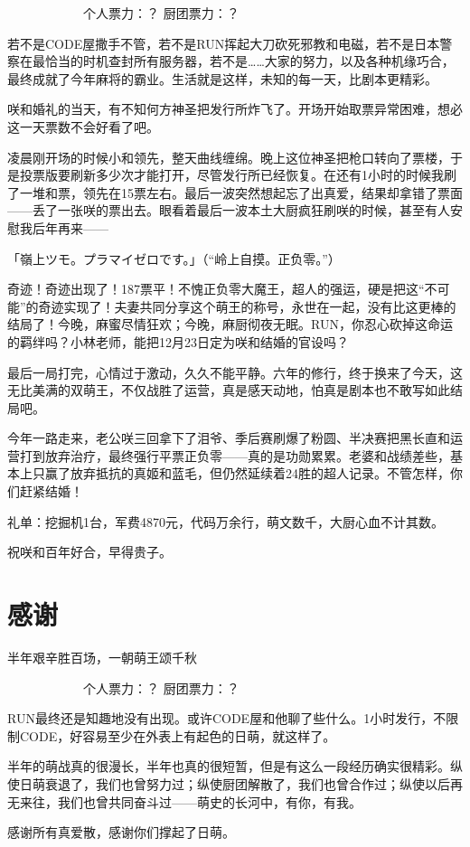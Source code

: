 　　　　　　个人票力：？ 厨团票力：？

若不是CODE屋撒手不管，若不是RUN挥起大刀砍死邪教和电磁，若不是日本警察在最恰当的时机查封所有服务器，若不是……大家的努力，以及各种机缘巧合，最终成就了今年麻将的霸业。生活就是这样，未知的每一天，比剧本更精彩。

咲和婚礼的当天，有不知何方神圣把发行所炸飞了。开场开始取票异常困难，想必这一天票数不会好看了吧。

凌晨刚开场的时候小和领先，整天曲线缠绵。晚上这位神圣把枪口转向了票楼，于是投票版要刷新多少次才能打开，尽管发行所已经恢复。在还有1小时的时候我刷了一堆和票，领先在15票左右。最后一波突然想起忘了出真爱，结果却拿错了票面——丢了一张咲的票出去。眼看着最后一波本土大厨疯狂刷咲的时候，甚至有人安慰我后年再来——

「嶺上ツモ。プラマイゼロです。」（“岭上自摸。正负零。”）

奇迹！奇迹出现了！187票平！不愧正负零大魔王，超人的强运，硬是把这“不可能”的奇迹实现了！夫妻共同分享这个萌王的称号，永世在一起，没有比这更棒的结局了！今晚，麻蜜尽情狂欢；今晚，麻厨彻夜无眠。RUN，你忍心砍掉这命运的羁绊吗？小林老师，能把12月23日定为咲和结婚的官设吗？

最后一局打完，心情过于激动，久久不能平静。六年的修行，终于换来了今天，这无比美满的双萌王，不仅战胜了运营，真是感天动地，怕真是剧本也不敢写如此结局吧。

今年一路走来，老公咲三回拿下了泪爷、季后赛刷爆了粉圆、半决赛把黑长直和运营打到放弃治疗，最终强行平票正负零——真的是功勋累累。老婆和战绩差些，基本上只赢了放弃抵抗的真姬和蓝毛，但仍然延续着24胜的超人记录。不管怎样，你们赶紧结婚！

礼单：挖掘机1台，军费4870元，代码万余行，萌文数千，大厨心血不计其数。

祝咲和百年好合，早得贵子。


\section{感谢}
半年艰辛胜百场，一朝萌王颂千秋

　　　　　　个人票力：？ 厨团票力：？

RUN最终还是知趣地没有出现。或许CODE屋和他聊了些什么。1小时发行，不限制CODE，好容易至少在外表上有起色的日萌，就这样了。

半年的萌战真的很漫长，半年也真的很短暂，但是有这么一段经历确实很精彩。纵使日萌衰退了，我们也曾努力过；纵使厨团解散了，我们也曾合作过；纵使以后再无来往，我们也曾共同奋斗过——萌史的长河中，有你，有我。

感谢所有真爱散，感谢你们撑起了日萌。

